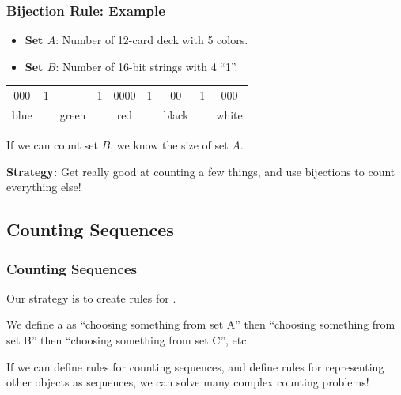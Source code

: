 \documentclass{beamer}
\begin{document}
\begin{frame}
  \frametitle{Bijection Rule: Example}

  {\larger
    \begin{itemize}
    \item {\bf Set $A$}: Number of 12-card deck with 5 colors.
    \item {\bf Set $B$}: Number of 16-bit strings with 4 ``1''.
    \end{itemize}

    \bigskip
    
    \begin{center}
      \begin{tabular}{ccccccccc}
        000 & 1 & & 1 & 0000 & 1 & 00 & 1 & 000\\
        blue & & green & & red & & black & & white\\
      \end{tabular}
    \end{center}

    \bigskip

    If we can count set $B$, we know the size of set $A$.

    \bigskip

    {\bf Strategy:} Get really good at counting a few things, and use
    bijections to count everything else!  }
\end{frame}

\subsection{Counting Sequences}

\begin{frame}
  \frametitle{Counting Sequences}

  {\larger
    
    Our strategy is to create rules for .

    \bigskip
    
    We define a  as ``choosing something from set
    A'' then ``choosing something from set B'' then ``choosing
    something from set C'', etc.

    \bigskip

    If we can define rules for counting sequences, and define rules
    for representing other objects as sequences, we can solve many
    complex counting problems!
  }
\end{frame}
\end{document}
